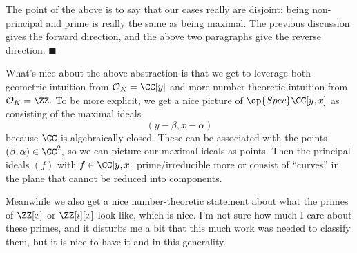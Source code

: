 The point of the above is to say that our cases really are disjoint: being non-principal and prime is really the same as being maximal. The previous discussion gives the forward direction, and the above two paragraphs give the reverse direction. $\blacksquare$

What's nice about the above abstraction is that we get to leverage both geometric intuition from $\mathcal O_K=\CC[y]$ and more number-theoretic intuition from $\mathcal O_K=\ZZ.$ To be more explicit, we get a nice picture of $\op{Spec}\CC[y,x]$ as consisting of the maximal ideals
\[(y-\beta,x-\alpha)\]
because $\CC$ is algebraically closed. These can be associated with the points $(\beta,\alpha)\in\CC^2,$ so we can picture our maximal ideals as points. Then the principal ideals $(f)$ with $f\in\CC[y,x]$ prime/irreducible more or consist of ``curves'' in the plane that cannot be reduced into components.

Meanwhile we also get a nice number-theoretic statement about what the primes of $\ZZ[x]$ or $\ZZ[i][x]$ look like, which is nice. I'm not sure how much I care about these primes, and it disturbs me a bit that this much work was needed to classify them, but it is nice to have it and in this generality.

